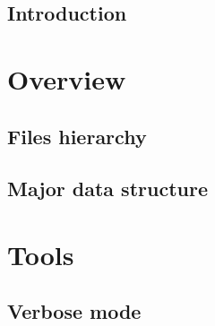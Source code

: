 \documentclass[12pt, oneside]{Thesis}
\begin{document}

\clearpage
{}
\printglossary[title=List of Symbols,toctitle=List of Symbols]



\mainmatter
\pagestyle{fancy}

\clearpage
\chapter{Introduction}
\label{Chapt:Introduction}


% 

\part{Overview}
\label{Part:Overview}

  \chapter{Files hierarchy}
  \label{Chapt:files}
  

  \chapter{Major data structure}
  \label{Chapt:ds}

\part{Tools}
\label{Part:Tools}

  \chapter{Verbose mode}
  \label{Chapt:Verbose}
  
\end{document}
